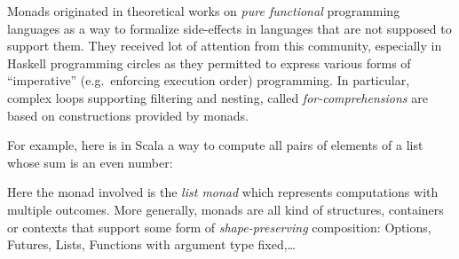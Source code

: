 \documentclass[11pt,]{article}
\newenvironment{Shaded}{}{}
\newcommand{\KeywordTok}[1]{\textcolor[rgb]{0.00,0.44,0.13}{\textbf{{#1}}}}
\newcommand{\DecValTok}[1]{\textcolor[rgb]{0.25,0.63,0.44}{{#1}}}
\newcommand{\FunctionTok}[1]{\textcolor[rgb]{0.02,0.16,0.49}{{#1}}}
\newcommand{\NormalTok}[1]{{#1}}
\begin{document}
Monads originated in theoretical works on \emph{pure functional}
programming languages as a way to formalize side-effects in languages
that are not supposed to support them. They received lot of attention
from this community, especially in Haskell programming circles as they
permitted to express various forms of ``imperative'' (e.g.~enforcing
execution order) programming. In particular, complex loops supporting
filtering and nesting, called \emph{for-comprehensions} are based on
constructions provided by monads.

For example, here is in Scala a way to compute all pairs of elements of
a list whose sum is an even number:

\begin{Shaded}
\end{Shaded}

Here the monad involved is the \emph{list monad} which represents
computations with multiple outcomes. More generally, monads are all kind
of structures, containers or contexts that support some form of
\emph{shape-preserving} composition: Options, Futures, Lists, Functions
with argument type fixed,\ldots{}
\end{document}
